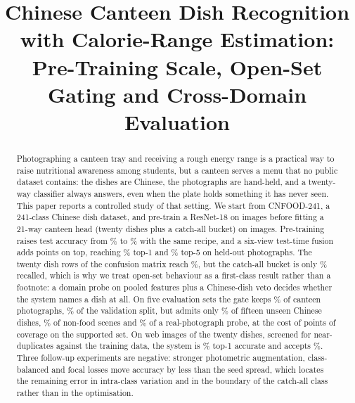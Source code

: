 \documentclass[conference]{IEEEtran}
\begin{document}
\title{Chinese Canteen Dish Recognition with Calorie-Range Estimation: Pre-Training Scale, Open-Set Gating and Cross-Domain Evaluation}

\author{
}

\maketitle

\begin{abstract}
Photographing a canteen tray and receiving a rough energy range is a practical
way to raise nutritional awareness among students, but a canteen serves a menu
that no public dataset contains: the dishes are Chinese, the photographs are
hand-held, and a twenty-way classifier always answers, even when the plate holds
something it has never seen. This paper reports a controlled study of that
setting. We start from CNFOOD-241, a 241-class Chinese dish dataset, and
pre-train a ResNet-18 on \cnPreTrainN{} images before fitting a 21-way canteen
head (twenty dishes plus a catch-all bucket) on \cnTrainN{} images. Pre-training
raises test accuracy from \cnNoPreTest\% to \cnTest\% with the same recipe, and a
six-view test-time fusion adds \cnFuseGain{} points on top, reaching
\cnFuseTop\% top-1 and \cnFuseTopFive\% top-5 on \cnTestN{} held-out photographs.
The twenty dish rows of the confusion matrix reach \cnDishAcc\%, but the
catch-all bucket is only \cnOtherRecall\% recalled, which is why we treat
open-set behaviour as a first-class result rather than a footnote: a domain
probe on pooled features plus a Chinese-dish veto decides whether the system
names a dish at all. On five evaluation sets the gate keeps \gateIn\% of canteen
photographs, \gateVal\% of the validation split, but admits only \gateOutCn\% of
fifteen unseen Chinese dishes, \gateOutOther\% of non-food scenes and
\gateReal\% of a real-photograph probe, at the cost of \gateInCost{} points of
coverage on the supported set. On \webN{} web images of the twenty dishes,
screened for near-duplicates against the training data, the system is
\webTop\% top-1 accurate and accepts \webAccept\%. Three follow-up experiments
are negative: stronger photometric augmentation, class-balanced and focal losses
move accuracy by less than the seed spread, which locates the remaining error in
intra-class variation and in the boundary of the catch-all class rather than in
the optimisation.
\end{abstract}
\end{document}
